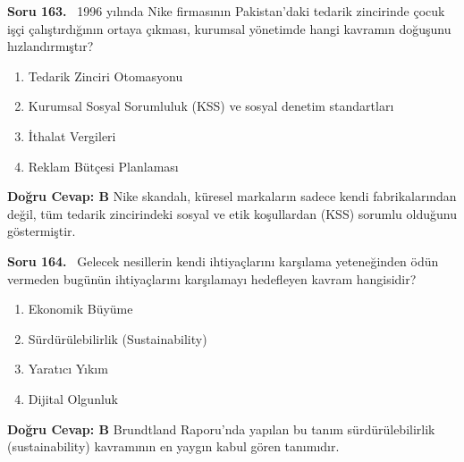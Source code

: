 \documentclass[11pt,a4paper,openany]{book}
\begin{document}
\needspace{5cm}
\vspace{8pt}
\noindent\textbf{\large\sffamily Soru 163.} \ 1996 yılında Nike firmasının Pakistan'daki tedarik zincirinde çocuk işçi çalıştırdığının ortaya çıkması, kurumsal yönetimde hangi kavramın doğuşunu hızlandırmıştır?
\begin{enumerate}[label=\Alph*), leftmargin=25pt, topsep=4pt, itemsep=2pt]
    \item Tedarik Zinciri Otomasyonu
    \item Kurumsal Sosyal Sorumluluk (KSS) ve sosyal denetim standartları
    \item İthalat Vergileri
    \item Reklam Bütçesi Planlaması
\end{enumerate}
\vspace{4pt}
\begin{tcolorbox}[title=Cevap ve Açıklama, colback=gray!3!white, colframe=primarycolor!90!black, arc=2mm, fonttitle=\bfseries\sffamily, top=6pt, bottom=6pt]
    \textbf{Doğru Cevap: B}
    \vspace{2pt}
    Nike skandalı, küresel markaların sadece kendi fabrikalarından değil, tüm tedarik zincirindeki sosyal ve etik koşullardan (KSS) sorumlu olduğunu göstermiştir.
\end{tcolorbox}
\vspace{10pt}

\needspace{5cm}
\vspace{8pt}
\noindent\textbf{\large\sffamily Soru 164.} \ Gelecek nesillerin kendi ihtiyaçlarını karşılama yeteneğinden ödün vermeden bugünün ihtiyaçlarını karşılamayı hedefleyen kavram hangisidir?
\begin{enumerate}[label=\Alph*), leftmargin=25pt, topsep=4pt, itemsep=2pt]
    \item Ekonomik Büyüme
    \item Sürdürülebilirlik (Sustainability)
    \item Yaratıcı Yıkım
    \item Dijital Olgunluk
\end{enumerate}
\vspace{4pt}
\begin{tcolorbox}[title=Cevap ve Açıklama, colback=gray!3!white, colframe=primarycolor!90!black, arc=2mm, fonttitle=\bfseries\sffamily, top=6pt, bottom=6pt]
    \textbf{Doğru Cevap: B}
    \vspace{2pt}
    Brundtland Raporu'nda yapılan bu tanım sürdürülebilirlik (sustainability) kavramının en yaygın kabul gören tanımıdır.
\end{tcolorbox}
\vspace{10pt}
\end{document}
